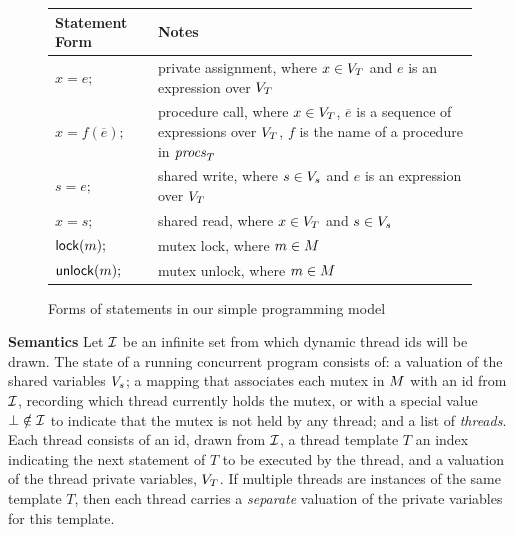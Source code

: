 \begin{figure}
\footnotesize
\center
\begin{tabular}{lp{5.5cm}}
\textbf{Statement Form} & \textbf{Notes} \\
\toprule

$x = e;$ & private assignment, where $x \in V_{T}$ and $e$ is an expression over $V_{T}$ \\
\midrule

$x = f(\overline{e});$ & procedure call, where $x \in V_{T}$, $\overline{e}$ is a sequence of expressions over $V_{T}$, $f$ is the name of a procedure in $\mathit{procs}_{T}$ \\
\midrule

$s = e;$ & shared write, where $s \in V_s$ and $e$ is an expression over $V_{T}$ \\
\midrule

$x = s;$ & shared read,  where $x \in V_{T}$ and $s \in V_s$ \\
\midrule

$\mathsf{lock}(m);$   & mutex lock, where $m \in M$ \\
\midrule

$\mathsf{unlock}(m);$ & mutex unlock, where $m \in M$\\
\bottomrule
\end{tabular}
\caption{Forms of statements in our simple programming model}
\label{fig:statements}
\end{figure}

\noindent\textbf{Semantics }
%
Let $\mathcal{I}$ be an infinite set from which dynamic thread ids will be drawn.  The state of a running concurrent program consists of: a valuation of the shared variables $V_s$; a mapping that associates each mutex in $M$ with an id from $\mathcal{I}$, recording which thread currently holds the mutex, or with a special value $\bot \notin \mathcal{I}$ to indicate that the mutex is not held by any thread; and a list of \emph{threads}.  Each thread consists of an id, drawn from $\mathcal{I}$, a thread template $T$ an index indicating the next statement of $T$ to be executed by the thread, and a valuation of the thread private variables, $V_{T}$.  If multiple threads are instances of the same template $T$, then each thread carries a \emph{separate} valuation of the private variables for this template.


